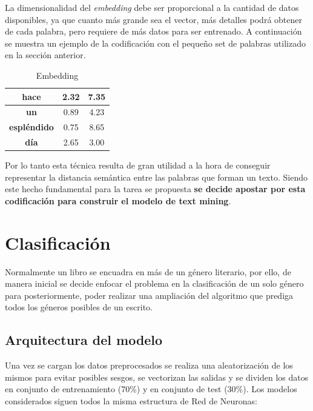 \documentclass[12pt,a4paper, xcolor=table]{article}
\begin{document}
\vspace{2mm}

La dimensionalidad del \textit{embedding} debe ser proporcional a la cantidad de datos disponibles, ya que cuanto más grande sea el vector, más detalles podrá obtener de cada palabra, pero requiere de más datos para ser entrenado. A continuación se muestra un ejemplo de la codificación con el pequeño set de palabras utilizado en la sección anterior.

  \begin{table}[h]
        \centering
        \begin{tabular}{|c|c|c|}
        \hline
        \textbf{hace}                     & 2.32 & 7.35 \\ \hline
        \textbf{un}                       & 0.89 & 4.23 \\ \hline
        \textbf{espléndido}               & 0.75 & 8.65 \\ \hline
        \textbf{día}                      & 2.65 & 3.00 \\ \hline
        \end{tabular}
        \caption{Embedding}
            \label{fig:graf_exp1}
    \end{table}

Por lo tanto esta técnica resulta de gran utilidad a la hora de conseguir representar la distancia semántica entre las palabras que forman un texto. Siendo este hecho fundamental para la tarea se propuesta \textbf{se decide apostar por esta codificación para construir el modelo de text mining}.

\newpage

\section{Clasificación}

Normalmente un libro se encuadra en más de un género literario, por ello, de manera inicial se decide enfocar el problema en la clasificación de un solo género para posteriormente, poder realizar una ampliación del algoritmo que prediga todos los géneros posibles de un escrito.

\subsection{Arquitectura del modelo}

Una vez se cargan los datos preprocesados se realiza una aleatorización de los mismos para evitar posibles sesgos, se vectorizan las salidas y se dividen los datos en conjunto de  entrenamiento (70\%) y en conjunto de test (30\%). Los modelos considerados siguen todos la misma estructura de Red de Neuronas:
\end{document}

